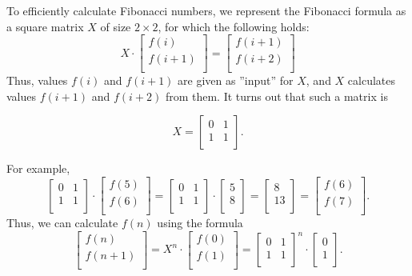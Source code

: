 \begin{samepage}
To efficiently calculate Fibonacci numbers,
we represent the
Fibonacci formula as a
square matrix $X$ of size $2 \times 2$,
for which the following holds:
\[ X \cdot
 \begin{bmatrix}
  f(i) \\
  f(i+1) \\
 \end{bmatrix}
=
 \begin{bmatrix}
  f(i+1) \\
  f(i+2) \\
 \end{bmatrix}
 \]
Thus, values $f(i)$ and $f(i+1)$ are given as
''input'' for $X$,
and $X$ calculates values $f(i+1)$ and $f(i+2)$
from them.
It turns out that such a matrix is

\[ X = 
 \begin{bmatrix}
  0 & 1 \\
  1 & 1 \\
 \end{bmatrix}.
\]
\end{samepage}
\noindent
For example,
\[
 \begin{bmatrix}
  0 & 1 \\
  1 & 1 \\
 \end{bmatrix}
\cdot
 \begin{bmatrix}
  f(5) \\
  f(6) \\
 \end{bmatrix}
=
 \begin{bmatrix}
  0 & 1 \\
  1 & 1 \\
 \end{bmatrix}
\cdot
 \begin{bmatrix}
  5 \\
  8 \\
 \end{bmatrix}
=
 \begin{bmatrix}
  8 \\
  13 \\
 \end{bmatrix}
=
 \begin{bmatrix}
  f(6) \\
  f(7) \\
 \end{bmatrix}.
\]
Thus, we can calculate $f(n)$ using the formula
\[
 \begin{bmatrix}
  f(n) \\
  f(n+1) \\
 \end{bmatrix}
=
X^n \cdot
 \begin{bmatrix}
  f(0) \\
  f(1) \\
 \end{bmatrix}
=
 \begin{bmatrix}
  0 & 1 \\
  1 & 1 \\
 \end{bmatrix}^n
\cdot
 \begin{bmatrix}
  0 \\
  1 \\
 \end{bmatrix}.
\]
